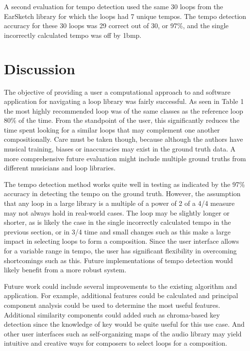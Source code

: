 \documentclass{article}
\begin{document}
A second evaluation for tempo detection used the same 30 loops from the EarSketch library for which the loops had 7 unique tempos. The tempo detection accuracy for these 30 loops was 29 correct out of 30, or 97\%, and the single incorrectly calculated tempo was off by 1bmp.


\section{Discussion}

The objective of providing a user a computational approach to and software application for navigating a loop library was fairly successful. As seen in Table 1 the most highly recommended loop was of the same classes as the reference loop 80\% of the time. From the standpoint of the user, this significantly reduces the time spent looking for a similar loops that may complement one another compositionally. Care must be taken though, because although the authors have musical training, biases or inaccuracies may exist in the ground truth data. A more comprehensive future evaluation might include multiple ground truths from different musicians and loop libraries.

The tempo detection method works quite well in testing as indicated by the 97\% accuracy in detecting the tempo on the ground truth. However, the assumption that any loop in a large library is a multiple of a power of 2 of a 4/4 measure may not always hold in real-world cases. The loop may be slightly longer or shorter, as is likely the case in the single incorrectly calculated tempo in the previous section, or in 3/4 time and small changes such as this make a large impact in selecting loops to form a composition. Since the user interface allows for a variable range in tempo, the user has significant flexibility in overcoming shortcomings such as this. Future implementations of tempo detection would likely benefit from a more robust system.

Future work could include several improvements to the existing algorithm and application. For example, additional features could be calculated and principal component analysis could be used to determine the most useful features. Additional similarity components could added such as chroma-based key detection since the knowledge of key would be quite useful for this use case. And other user interfaces such as self-organizing maps of the audio library may yield intuitive and creative ways for composers to select loops for a composition.
\end{document}
